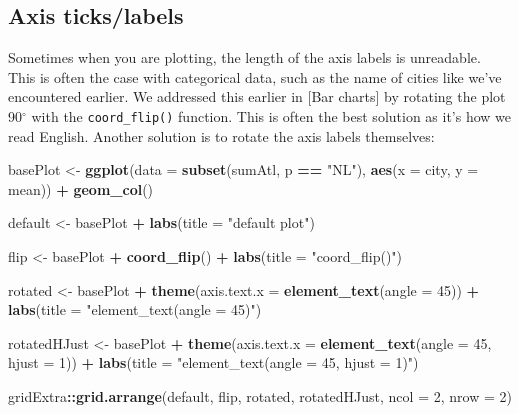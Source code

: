 \documentclass[
]{book}
\newenvironment{Shaded}{\begin{snugshade}}{\end{snugshade}}
\newcommand{\AttributeTok}[1]{\textcolor[rgb]{0.13,0.29,0.53}{#1}}
\newcommand{\DecValTok}[1]{\textcolor[rgb]{0.00,0.00,0.81}{#1}}
\newcommand{\FunctionTok}[1]{\textcolor[rgb]{0.13,0.29,0.53}{\textbf{#1}}}
\newcommand{\NormalTok}[1]{#1}
\newcommand{\OtherTok}[1]{\textcolor[rgb]{0.56,0.35,0.01}{#1}}
\newcommand{\SpecialCharTok}[1]{\textcolor[rgb]{0.81,0.36,0.00}{\textbf{#1}}}
\newcommand{\StringTok}[1]{\textcolor[rgb]{0.31,0.60,0.02}{#1}}
\begin{document}
\hypertarget{axis-tickslabels}{%
\subsection{Axis ticks/labels}\label{axis-tickslabels}}

Sometimes when you are plotting, the length of the axis labels is unreadable. This is often the case with categorical data, such as the name of cities like we've encountered earlier. We addressed this earlier in {[}Bar charts{]} by rotating the plot 90\(^\circ\) with the \texttt{coord\_flip()} function. This is often the best solution as it's how we read English. Another solution is to rotate the axis labels themselves:

\begin{Shaded}
\begin{Highlighting}[]
\NormalTok{basePlot }\OtherTok{\textless{}{-}} \FunctionTok{ggplot}\NormalTok{(}\AttributeTok{data =} \FunctionTok{subset}\NormalTok{(sumAtl, p }\SpecialCharTok{==} \StringTok{"NL"}\NormalTok{),}
       \FunctionTok{aes}\NormalTok{(}\AttributeTok{x =}\NormalTok{ city, }
           \AttributeTok{y =}\NormalTok{ mean)) }\SpecialCharTok{+}
  \FunctionTok{geom\_col}\NormalTok{()}

\NormalTok{default }\OtherTok{\textless{}{-}}\NormalTok{ basePlot }\SpecialCharTok{+}
  \FunctionTok{labs}\NormalTok{(}\AttributeTok{title =} \StringTok{"default plot"}\NormalTok{)}

\NormalTok{flip }\OtherTok{\textless{}{-}}\NormalTok{ basePlot }\SpecialCharTok{+}
  \FunctionTok{coord\_flip}\NormalTok{() }\SpecialCharTok{+}
  \FunctionTok{labs}\NormalTok{(}\AttributeTok{title =} \StringTok{"coord\_flip()"}\NormalTok{)}

\NormalTok{rotated }\OtherTok{\textless{}{-}}\NormalTok{ basePlot }\SpecialCharTok{+}
  \FunctionTok{theme}\NormalTok{(}\AttributeTok{axis.text.x =} \FunctionTok{element\_text}\NormalTok{(}\AttributeTok{angle =} \DecValTok{45}\NormalTok{)) }\SpecialCharTok{+}
  \FunctionTok{labs}\NormalTok{(}\AttributeTok{title =} \StringTok{"element\_text(angle = 45)"}\NormalTok{)}

\NormalTok{rotatedHJust }\OtherTok{\textless{}{-}}\NormalTok{ basePlot }\SpecialCharTok{+}
  \FunctionTok{theme}\NormalTok{(}\AttributeTok{axis.text.x =} \FunctionTok{element\_text}\NormalTok{(}\AttributeTok{angle =} \DecValTok{45}\NormalTok{, }\AttributeTok{hjust =} \DecValTok{1}\NormalTok{)) }\SpecialCharTok{+}
  \FunctionTok{labs}\NormalTok{(}\AttributeTok{title =} \StringTok{"element\_text(angle = 45, hjust = 1)"}\NormalTok{)}


\NormalTok{gridExtra}\SpecialCharTok{::}\FunctionTok{grid.arrange}\NormalTok{(default, flip, rotated, rotatedHJust, }\AttributeTok{ncol =} \DecValTok{2}\NormalTok{, }\AttributeTok{nrow =} \DecValTok{2}\NormalTok{)}
\end{Highlighting}
\end{Shaded}
\end{document}
